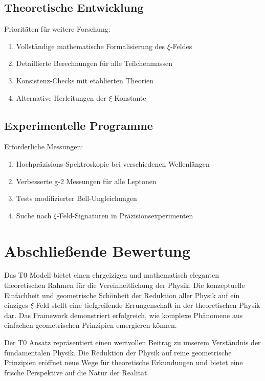 \documentclass[12pt,a4paper]{report}
\begin{document}
	\subsection{Theoretische Entwicklung}
	
	Prioritäten für weitere Forschung:
	
	\begin{enumerate}
		\item Vollständige mathematische Formalisierung des $\xi$-Feldes
		\item Detaillierte Berechnungen für alle Teilchenmassen
		\item Konsistenz-Checks mit etablierten Theorien
		\item Alternative Herleitungen der $\xi$-Konstante
	\end{enumerate}
	
	\subsection{Experimentelle Programme}
	
	Erforderliche Messungen:
	
	\begin{enumerate}
		\item Hochpräzisions-Spektroskopie bei verschiedenen Wellenlängen
		\item Verbesserte g-2 Messungen für alle Leptonen
		\item Tests modifizierter Bell-Ungleichungen
		\item Suche nach $\xi$-Feld-Signaturen in Präzisionsexperimenten
	\end{enumerate}
	
	\section{Abschließende Bewertung}
	
	Das T0 Modell bietet einen ehrgeizigen und mathematisch eleganten theoretischen Rahmen für die Vereinheitlichung der Physik. Die konzeptuelle Einfachheit und geometrische Schönheit der Reduktion aller Physik auf ein einziges $\xi$-Feld stellt eine tiefgreifende Errungenschaft in der theoretischen Physik dar. Das Framework demonstriert erfolgreich, wie komplexe Phänomene aus einfachen geometrischen Prinzipien emergieren können.
	
	Der T0 Ansatz repräsentiert einen wertvollen Beitrag zu unserem Verständnis der fundamentalen Physik. Die Reduktion der Physik auf reine geometrische Prinzipien eröffnet neue Wege für theoretische Erkundungen und bietet eine frische Perspektive auf die Natur der Realität.
	
\end{document}
